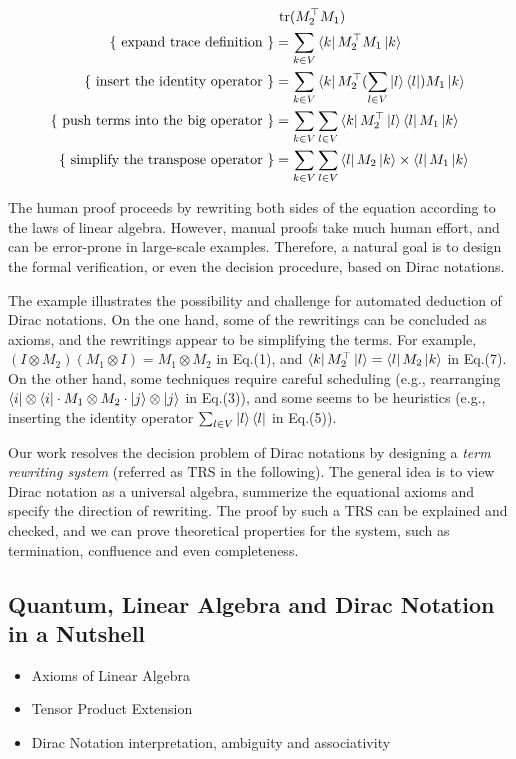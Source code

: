 \documentclass[manuscript, review, timestamp]{acmart}
\begin{document}
\begin{align}
  & \ \mathrm{tr}(M_2^\top M_1) \notag \\
  \text{\{ expand trace definition \}} & = \sum_{k \in V} \bra{k} M_2^\top M_1 \ket{k} \\
  \text{\{ insert the identity operator \}} & = \sum_{k \in V} \bra{k} M_2^\top (\sum_{l \in V} \ket{l}\bra{l}) M_1 \ket{k} \\
  \text{\{ push terms into the big operator \}} & = \sum_{k \in V} \sum_{l \in V} \bra{k} M_2^\top \ket{l}\bra{l} M_1 \ket{k} \\
  \text{\{ simplify the transpose operator \}} & = \sum_{k \in V} \sum_{l \in V} \bra{l} M_2 \ket{k} \times \bra{l} M_1 \ket{k}
\end{align}

The human proof proceeds by rewriting both sides of the equation according to the laws of linear algebra. 
However, manual proofs take much human effort, and can be error-prone in large-scale examples. 
Therefore, a natural goal is to design the formal verification, or even the decision procedure, based on Dirac notations.

The example illustrates the possibility and challenge for automated deduction of Dirac notations.
On the one hand, some of the rewritings can be concluded as axioms, and the rewritings appear to be simplifying the terms. For example, $(I \otimes M_2)(M_1 \otimes I) = M_1 \otimes M_2$ in Eq.(1), and $\bra{k}M_2^\top\ket{l} = \bra{l}M_2\ket{k}$ in Eq.(7). On the other hand, some techniques require careful scheduling (e.g., rearranging $\bra{i}\otimes\bra{i}\cdot M_1 \otimes M_2 \cdot \ket{j} \otimes \ket{j}$ in Eq.(3)), and some seems to be heuristics (e.g., inserting the identity operator $\sum_{l \in V}\ket{l}\bra{l}$ in Eq.(5)).

Our work resolves the decision problem of Dirac notations by designing a \textit{term rewriting system} (referred as TRS in the following). The general idea is to view Dirac notation as a universal algebra, summerize the equational axioms and specify the direction of rewriting. The proof by such a TRS can be explained and checked, and we can prove theoretical properties for the system, such as termination, confluence and even completeness.

\subsection{Quantum, Linear Algebra and Dirac Notation in a Nutshell}
\begin{itemize}
  \item Axioms of Linear Algebra

  \item Tensor Product Extension

  \item Dirac Notation interpretation, ambiguity and associativity
\end{itemize}
\end{document}
